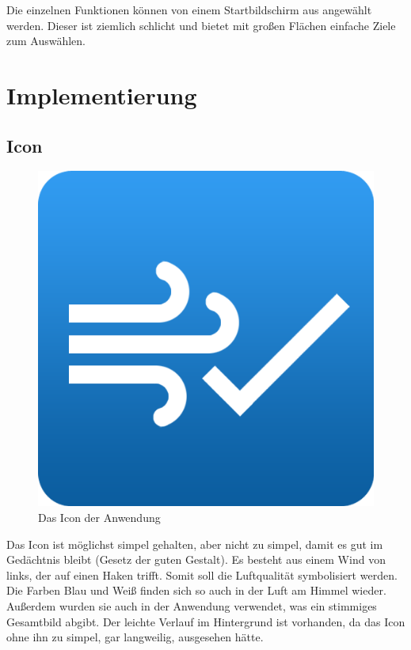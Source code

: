 \documentclass[a4paper,10pt]{article}
\begin{document}
Die einzelnen Funktionen können von einem Startbildschirm aus angewählt werden. Dieser ist ziemlich schlicht und bietet mit großen Flächen einfache Ziele zum Auswählen.

\newpage



\section{Implementierung}

\subsection{Icon}

\begin{figure}[!h]
	\centering
	\includegraphics[scale=0.4]{images/logo.png}
	\caption{Das Icon der Anwendung}
\end{figure}

Das Icon ist möglichst simpel gehalten, aber nicht zu simpel, damit es gut im Gedächtnis bleibt (Gesetz der guten Gestalt). Es besteht aus einem Wind von links, der auf einen Haken trifft. Somit soll die Luftqualität symbolisiert werden. Die Farben Blau und Weiß finden sich so auch in der Luft am Himmel wieder. Außerdem wurden sie auch in der Anwendung verwendet, was ein stimmiges Gesamtbild abgibt. Der leichte Verlauf im Hintergrund ist vorhanden, da das Icon ohne ihn zu simpel, gar langweilig, ausgesehen hätte.
\end{document}
